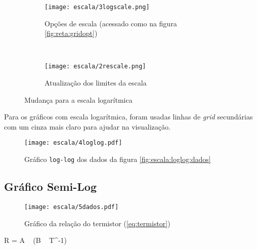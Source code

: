     \begin{figure}[htbp]
        \centering
        \begin{subfigure}{0.55\textwidth}
            \centering
            \texttt{[image: escala/3logscale.png]}

            \caption{Opções de escala (acessado como na figura \ref{fig:reta:gridopt})}
            \label{fig:escala:rescale}
        \end{subfigure}
        ~
        \begin{subfigure}{0.4\textwidth}
            \centering
            \texttt{[image: escala/2rescale.png]}

            \caption{Atualização dos limites da escala}
            \label{fig:escala:logscale}
        \end{subfigure}
        \caption{Mudança para a escala logarítmica}
        \label{fig:escala:tutorial}
    \end{figure}

    \begin{nota}
        Para os gráficos com escala logarítmica, foram usadas linhas de \textit{grid} secundárias com um cinza mais claro para ajudar na visualização.
    \end{nota}

    \begin{figure}[htbp]
        \centering
        \texttt{[image: escala/4loglog.pdf]}

        \caption{Gráfico \texttt{log-log} dos dados da figura \ref{fig:escala:loglog:dados}}
        \label{fig:escala:loglog:resultado}
    \end{figure}


\subsection{Gráfico Semi-Log}

    \begin{figure}[htbp]
        \centering
        \texttt{[image: escala/5dados.pdf]}

        \caption{Gráfico da relação do termistor (\ref{eq:termistor})}
        \label{fig:escala:semilog:dados}
    \end{figure}

    \begin{equacao} \label{eq:termistor}
        R = A ~ \exp\left(B ~ T^{-1}\right)
    \end{equacao}


